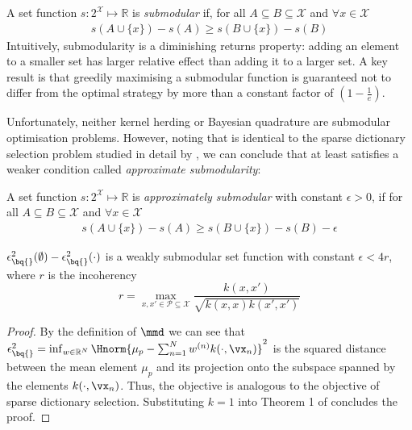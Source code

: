 A set function $s:2^\mathcal{X} \mapsto \mathbb{R}$ is \textit{submodular} if, for all $A\subseteq B\subseteq \mathcal{X}$ and $\forall x \in \mathcal{X}$
%
\begin{align}
	s(A\cup\{x\})-s(A)\geq s(B\cup\{x\})-s(B)
\end{align}
%
Intuitively, submodularity is a diminishing returns property: adding an element to a smaller set has larger relative effect than adding it to a larger set. A key result \cite[see e.\,g.\ ][and references therein]{KrauseCevher10} is that greedily maximising a submodular function is guaranteed not to differ from the optimal strategy by more than a constant factor of $(1-\frac{1}{e})$.

Unfortunately, neither kernel herding or Bayesian quadrature are submodular optimisation problems. However, noting that \sbq{} is identical to the sparse dictionary selection problem studied in detail by \citet{KrauseCevher10}, we can conclude that \sbq{} at least satisfies a weaker condition called \emph{approximate submodularity}:

A set function $s:2^\mathcal{X} \mapsto \mathbb{R}$ is \textit{approximately submodular} with constant $\epsilon>0$, if for all $A\subseteq B\subseteq \mathcal{X}$ and $\forall x \in \mathcal{X}$
%
\begin{align}
s(A\cup\{x\})-s(A)\geq s(B\cup\{x\})-s(B) - \epsilon
\end{align}

\begin{proposition}\label{prop:submodularity_SBQ}
$\epsilon^{2}_{\bq{}}(\emptyset)-\epsilon^{2}_{\bq{}}(\cdot)$ is a weakly submodular set function with constant $\epsilon<4r$, where $r$ is the incoherency
%
\begin{equation}
	r = \max_{x,x'\in\mathcal{P}\subseteq\mathcal{X}} \frac{k(x,x')}{\sqrt{k(x,x)k(x',x')}}
\end{equation}

\begin{proof} By the definition of $\mmd$ we can see that
$\epsilon^{2}_{\bq{}} = \inf_{w\in\mathbb{R}^N}\Hnorm{\mu_p - \sum_{n=1}^N w^{(n)}k(\cdot,\vx_n)}^2$ is the squared distance between the mean element $\mu_p$ and its projection onto the subspace spanned by the elements $k(\cdot,\vx_n)$. Thus, the objective is analogous to the objective of sparse dictionary selection. Substituting $k=1$ into Theorem 1 of \citet{KrauseCevher10} concludes the proof.
\end{proof}
\end{proposition}

